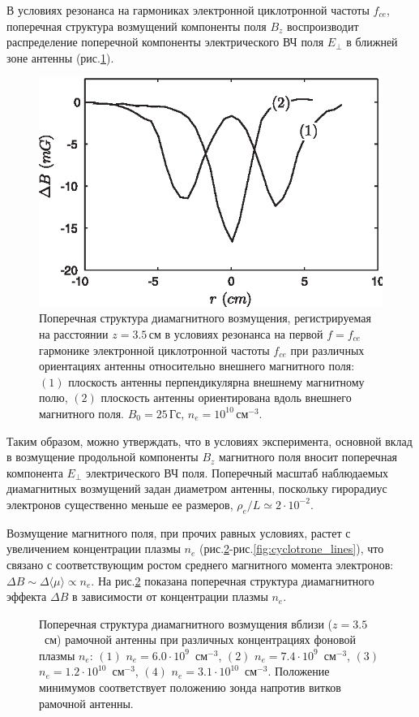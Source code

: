 \documentclass[autoref,10pt]{disser}
\begin{document}
В условиях резонанса на гармониках электронной циклотронной частоты $f_{ce}$, поперечная структура возмущений компоненты поля $B_{z}$  воспроизводит распределение поперечной компоненты электрического ВЧ поля $E_{\perp}$ в ближней зоне антенны (\mbox{рис.\ref{fig:tr+par_distr}}).
\begin{figure}[H]
    \centering
    \includegraphics*[width=0.7\columnwidth]{pics/tr+par_distr.eps}
    \caption{Поперечная структура диамагнитного возмущения, регистрируемая на расстоянии $z=3.5$\,см в условиях резонанса на первой $f=f_{ce}$  гармонике электронной циклотронной частоты $f_{ce}$ при различных ориентациях антенны относительно внешнего магнитного поля: $(1)$ плоскость антенны перпендикулярна внешнему магнитному полю, $(2)$ плоскость антенны ориентирована вдоль внешнего магнитного поля. $B_{0}=25$\,Гс, $n_{e}=10^{10}$\,см$^{-3}$.}
    \label{fig:tr+par_distr}
\end{figure}

Таким образом, можно утверждать, что в условиях эксперимента, основной вклад в возмущение продольной компоненты  $B_{z}$ магнитного поля вносит поперечная компонента $E_{\perp}$ электрического ВЧ поля. Поперечный масштаб наблюдаемых диамагнитных возмущений задан диаметром антенны, поскольку гирорадиус электронов существенно меньше ее размеров, $\rho_e/L \simeq2\cdot 10^{-2}$. 

Возмущение магнитного поля, при прочих равных условиях, растет с увеличением концентрации плазмы $n_{e}$ (\mbox{рис.\ref{fig:ne_distr}-рис.\ref{fig:cyclotrone_lines}}), что связано с соответствующим ростом среднего магнитного момента электронов: $\Delta{}B\sim{}\Delta{}\langle{}\mu{}\rangle{}\propto{}n_{e}$.
На \mbox{рис.\ref{fig:ne_distr}} показана поперечная структура диамагнитного эффекта $\Delta{}B$ в зависимости от концентрации плазмы $n_{e}$. 
\begin{figure}[H]
   \centering
   \def\svgwidth{0.6\columnwidth} %
   
   \vspace{0.5cm}
   \caption{Поперечная структура диамагнитного возмущения вблизи ($z=3.5$~см) рамочной антенны при различных концентрациях фоновой плазмы $n_{e}$: $(1)$ $n_{e}=6.0\cdot{}10^{9}$~см$^{-3}$, $(2)$ $n_{e}=7.4\cdot{}10^{9}$~см$^{-3}$, $(3)$  $n_{e}=1.2\cdot{}10^{10}$~см$^{-3}$, $(4)$ $n_{e}=3.1\cdot{}10^{10}$~см$^{-3}$. Положение минимумов соответствует положению зонда напротив витков рамочной антенны.}
   \label{fig:ne_distr}
\end{figure}
\end{document}
